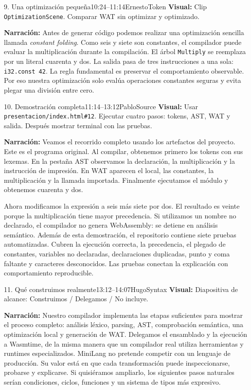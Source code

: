 \documentclass[11pt,letterpaper]{article}
\newcommand{\visual}[1]{\textbf{Visual:} #1}
\begin{document}
\begin{segmento}{9. Una optimización pequeña}{10:24--11:14}{Ernesto}{Token}
\visual{Clip \texttt{OptimizationScene}. Comparar WAT sin optimizar y optimizado.}

\textbf{Narración:} Antes de generar código podemos realizar una optimización sencilla llamada \emph{constant folding}. Como seis y siete son constantes, el compilador puede evaluar la multiplicación durante la compilación. El árbol \texttt{Multiply} se reemplaza por un literal cuarenta y dos. La salida pasa de tres instrucciones a una sola: \texttt{i32.const 42}. La regla fundamental es preservar el comportamiento observable. Por eso nuestra optimización solo evalúa operaciones constantes seguras y evita plegar una división entre cero.
\end{segmento}

\begin{segmento}{10. Demostración completa}{11:14--13:12}{Pablo}{Source}
\visual{Usar \texttt{presentacion/index.html\#12}. Ejecutar cuatro pasos: tokens, AST, WAT y salida. Después mostrar terminal con las pruebas.}

\textbf{Narración:} Veamos el recorrido completo usando los artefactos del proyecto. Este es el programa original. Al compilar, obtenemos primero los tokens con sus lexemas. En la pestaña AST observamos la declaración, la multiplicación y la instrucción de impresión. En WAT aparecen el local, las constantes, la multiplicación y la llamada importada. Finalmente ejecutamos el módulo y obtenemos cuarenta y dos.

Ahora modificamos la expresión a seis más siete por dos. El resultado es veinte porque la multiplicación tiene mayor precedencia. Si utilizamos un nombre no declarado, el compilador no genera WebAssembly: se detiene en análisis semántico. Además de esta demostración, el repositorio contiene siete pruebas automatizadas. Cubren la ejecución correcta, la precedencia, el plegado de constantes, variables no declaradas, declaraciones duplicadas, punto y coma faltante y caracteres desconocidos. Las pruebas conectan la explicación con comportamiento reproducible.
\end{segmento}

\begin{segmento}{11. Qué construimos realmente}{13:12--14:07}{Hugo}{Syntax}
\visual{Diapositiva de alcance: Construimos / Delegamos / No incluye.}

\textbf{Narración:} Nuestro compilador implementa las etapas suficientes para mostrar el proceso completo: análisis léxico, parsing, AST, comprobación semántica, una optimización local y generación de WAT. Delegamos el ensamblado y la ejecución a Wasmtime, de la misma manera que un compilador real utiliza herramientas y runtimes especializados. MiniLang no pretende competir con un lenguaje de producción. Su valor está en que cada transformación puede inspeccionarse, probarse y explicarse. Si quisiéramos ampliarlo, los siguientes pasos naturales serían condiciones, ciclos, funciones y un sistema de tipos más expresivo.
\end{segmento}
\end{document}
